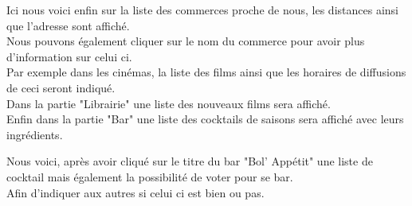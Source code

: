 \documentclass[10pt,a4paper, landscape]{report}
\begin{document}
{{{{Ici nous voici enfin sur la liste des commerces proche de nous, les distances ainsi que l'adresse sont affiché. \\
Nous pouvons également cliquer sur le nom du commerce pour avoir plus d'information sur celui ci. \\
Par exemple dans les cinémas, la liste des films ainsi que les horaires de diffusions de ceci seront indiqué. \\
Dans la partie "Librairie" une liste des nouveaux films sera affiché. \\
Enfin dans la partie "Bar" une liste des cocktails de saisons sera affiché avec leurs ingrédients. \\
{%
\setlength{\fboxsep}{0pt}%
\setlength{\fboxrule}{2pt}%
%

\newpage
Nous voici, après avoir cliqué sur le titre du bar "Bol' Appétit" une liste de cocktail mais également la possibilité de voter pour se bar. \\
Afin d'indiquer aux autres si celui ci est bien ou pas. \\
{%
\setlength{\fboxsep}{0pt}%
\setlength{\fboxrule}{2pt}%
%

}}}}}}
\end{document}
